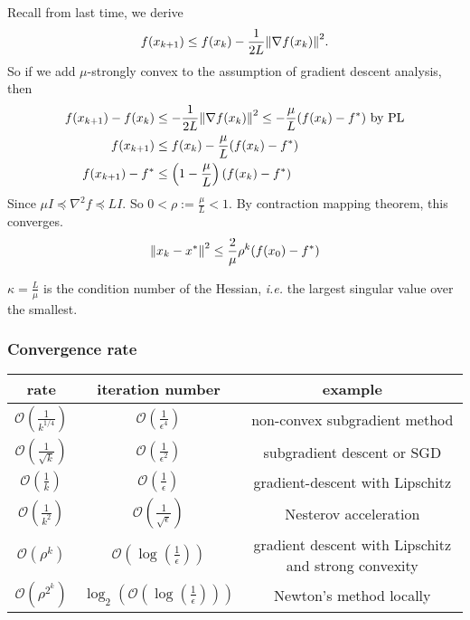 \documentclass[class=article,crop=false]{standalone}
\begin{document}
Recall from last time, we derive
\[
	f(x_{k+1}) \leq f(x_k) - \frac{1}{2L} {\left\lVert{ \nabla f(x_k)}\right\rVert}^2 
.\] 
So if we add $ \mu$-strongly convex to the assumption of gradient descent analysis, then
\begin{align*}
	f(x_{k+1}) - f(x_k) &\leq - \frac{1}{2L} {\left\lVert{ \nabla f(x_k)}\right\rVert}^2 \leq -\frac{\mu}{L} (f(x_k) -f^*) \text{ by PL}     \\
	f(x_{k+1}) &\leq f(x_k) - \frac{\mu}{L} (f(x_k) - f^* )\\ 
	f(x_{k+1}) - f^* &\leq \left( 1 - \frac{\mu}{L} \right) (f(x_k) - f^* )
\end{align*}
Since $ \mu I \preceq \nabla^2 f \preceq LI$. So $ 0< \rho:= \frac{\mu}{L} < 1$. By contraction mapping theorem, this converges.
\begin{align*}
	{\left\lVert{ x_k-x^* }\right\rVert}^2 \leq \frac{2}{\mu} \rho^{k} (f(x_0) - f^* )
\end{align*}
\begin{remark}
$ \kappa = \frac{L}{\mu}$ is the condition number of the Hessian, \emph{i.e.} the largest singular value over the smallest.
\end{remark}
\subsubsection{Convergence rate}
\begin{table}[H]
	\centering
	\begin{tabular}{c|c|c}
		rate& iteration number &example\\
		\hline
		\hline
		$ \mathcal{ O}\left( \frac{1}{k^{1 /4}} \right) $ & $ \mathcal{ O}\left( \frac{1}{ \epsilon^{4}} \right) $ & non-convex subgradient method\\
		\hline
		$ \mathcal{ O}\left( \frac{1}{\sqrt{k} } \right) $ & $ \mathcal{ O}\left( \frac{1}{ \epsilon^2} \right) $ & subgradient descent or SGD\\
		\hline
		$ \mathcal{ O}\left( \frac{1}{k} \right) $& $ \mathcal{ O}\left( \frac{1}{ \epsilon} \right) $ & gradient-descent with Lipschitz\\
		\hline
		$ \mathcal{ O} \left( \frac{1}{k^2} \right) $ & $ \mathcal{ O}\left( \frac{1}{ \sqrt{ \epsilon} } \right) $ & Nesterov acceleration\\
		\hline
		$ \mathcal{ O}(\rho^{k})$ & $ \mathcal{ O}\left( \log\left( \frac{1}{ \epsilon} \right)  \right) $& gradient descent with Lipschitz and strong convexity\\
		\hline
		$ \mathcal{ O}\left( \rho^{2^{k}} \right) $ & $ \log_2 \left(\mathcal{ O}\left( \log \left( \frac{1}{ \epsilon} \right)  \right) \right) $ & Newton's method locally\\
	\end{tabular}
\end{table}
\end{document}
